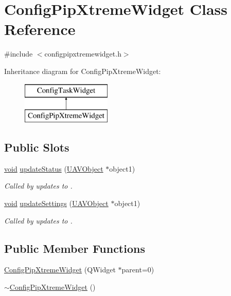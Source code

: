 \hypertarget{class_config_pip_xtreme_widget}{\section{\-Config\-Pip\-Xtreme\-Widget \-Class \-Reference}
\label{class_config_pip_xtreme_widget}
}


{\ttfamily \#include $<$configpipxtremewidget.\-h$>$}

\-Inheritance diagram for \-Config\-Pip\-Xtreme\-Widget\-:\begin{figure}[H]
\begin{center}
\leavevmode
\includegraphics[height=2.000000cm]{class_config_pip_xtreme_widget}
\end{center}
\end{figure}
\subsection*{\-Public \-Slots}
\begin{DoxyCompactItemize}
\item 
\hyperlink{group___u_a_v_objects_plugin_ga444cf2ff3f0ecbe028adce838d373f5c}{void} \hyperlink{group___config_plugin_gabc0f7192a99a705a14adb140f5ede521}{update\-Status} (\hyperlink{class_u_a_v_object}{\-U\-A\-V\-Object} $\ast$object1)
\begin{DoxyCompactList}\small\item\em \-Called by updates to . \end{DoxyCompactList}\item 
\hyperlink{group___u_a_v_objects_plugin_ga444cf2ff3f0ecbe028adce838d373f5c}{void} \hyperlink{group___config_plugin_gabf6dbd1961284c12d242657add38d28c}{update\-Settings} (\hyperlink{class_u_a_v_object}{\-U\-A\-V\-Object} $\ast$object1)
\begin{DoxyCompactList}\small\item\em \-Called by updates to . \end{DoxyCompactList}\end{DoxyCompactItemize}
\subsection*{\-Public \-Member \-Functions}
\begin{DoxyCompactItemize}
\item 
\hyperlink{group___config_plugin_ga93976625b77842e32b44100f87cad868}{\-Config\-Pip\-Xtreme\-Widget} (\-Q\-Widget $\ast$parent=0)
\item 
\hyperlink{group___config_plugin_ga225924f55de51a2a536ad41dba22fbc2}{$\sim$\-Config\-Pip\-Xtreme\-Widget} ()
\end{DoxyCompactItemize}


